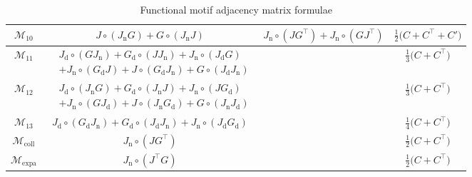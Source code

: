 \documentclass[12pt,draft]{ociamthesis}
\theoremstyle{plain}
\theoremstyle{definition}
\theoremstyle{remark}
\newcommand\ca[1]{\mathcal{#1}}
\begin{document}
\begin{table}[H]
\begin{tabular}{ |c|c|c|c| }
    \hline

    $\ca{M}_{10}$ & $J \circ (J_\mathrm{n} G) + G \circ (J_\mathrm{n} J)$ &
    $J_\mathrm{n} \circ (J G^\top) + J_\mathrm{n} \circ (G J^\top)$ &
    $\frac{1}{2} \big(C + C^\top + C' \big)$ \\

    \hline

    $\ca{M}_{11}$ & \rule{0pt}{1.9em}$\displaystyle
    \begin{aligned}
      & J_\mathrm{d} \circ (G J_\mathrm{n}) + G_\mathrm{d} \circ (J
      J_\mathrm{n}) + J_\mathrm{n} \circ (J_\mathrm{d} G) \\
      &  + J_\mathrm{n} \circ (G_\mathrm{d} J) + J \circ (G_\mathrm{d}
      J_\mathrm{n}) + G \circ (J_\mathrm{d} J_\mathrm{n})
    \end{aligned}
    $\rule[-1.3em]{0pt}{1em} & & $\frac{1}{3} \big(C + C^\top\big)$ \\

    \hline

    $\ca{M}_{12}$ & \rule{0pt}{1.9em}$\displaystyle
    \begin{aligned}
      & J_\mathrm{d} \circ (J_\mathrm{n} G) + G_\mathrm{d} \circ (J_\mathrm{n}
      J) + J_\mathrm{n} \circ (J G_\mathrm{d}) \\
      & + J_\mathrm{n} \circ (G J_\mathrm{d}) + J \circ (J_\mathrm{n}
      G_\mathrm{d}) + G \circ (J_\mathrm{n} J_\mathrm{d})
    \end{aligned}
    $\rule[-1.3em]{0pt}{1em} & & $ \frac{1}{3} \big(C + C^\top\big)$ \\

    \hline

    $\ca{M}_{13}$ & $J_\mathrm{d} \circ (G_\mathrm{d} J_\mathrm{n}) +
    G_\mathrm{d} \circ (J_\mathrm{d} J_\mathrm{n}) + J_\mathrm{n} \circ
    (J_\mathrm{d} G_\mathrm{d})$ & & $\frac{1}{4} \big(C + C^\top \big)$ \\

    \hline

    $\ca{M}_\mathrm{coll}$ & $J_\mathrm{n} \circ (J G^\top)$ & & $\frac{1}{2}
    \big( C + C^\top \big)$ \\

    \hline

    $\ca{M}_\mathrm{expa}$ & $J_\mathrm{n} \circ (J^\top G)$ & & $\frac{1}{2}
    \big( C + C^\top \big)$ \\

    \hline

  \end{tabular}
  \caption{Functional motif adjacency matrix formulae}
  \label{tab:motif_adj_mat_table}
\end{table}
\clearpage{}
\clearpage{}
\end{document}
